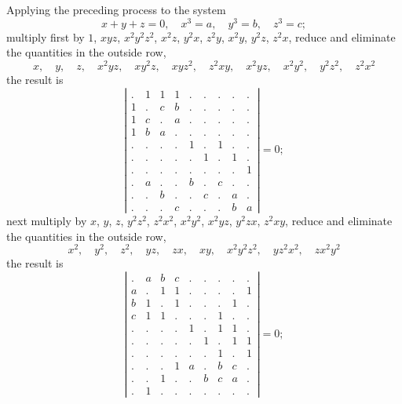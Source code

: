 \documentclass[11pt]{article}
\begin{document}
Applying the preceding process to the system
\[
x + y + z = 0, \quad x^3 = a, \quad y^3 = b, \quad z^3 = c;
\]
multiply first by $1$, $xyz$, $x^2y^2z^2$, $x^2z$, $y^2x$, $z^2y$, $x^2y$, $y^2z$, $z^2x$, reduce and eliminate the quantities in the outside row,
\[
x, \quad y, \quad z, \quad x^2yz, \quad xy^2z, \quad xyz^2, \quad z^2xy, \quad x^2yz, \quad x^2y^2, \quad y^2z^2, \quad z^2x^2
\]
the result is
\[
\left|\begin{array}{ccc|ccc|ccc}
. & 1 & 1 & 1 & . & . & . & . & . \\
1 & . & c & b & . & . & . & . & . \\
1 & c & . & a & . & . & . & . & . \\
1 & b & a & . & . & . & . & . & . \\
\hline
. & . & . & . & 1 & . & 1 & . & . \\
. & . & . & . & . & 1 & . & 1 & . \\
. & . & . & . & . & . & . & . & 1 \\
\hline
. & a & . & . & b & . & c & . & . \\
. & . & b & . & . & c & . & a & . \\
. & . & . & c & . & . & . & b & a
\end{array}\right| = 0;
\]
next multiply by $x$, $y$, $z$, $y^2z^2$, $z^2x^2$, $x^2y^2$, $x^2yz$, $y^2zx$, $z^2xy$, reduce and eliminate the quantities in the outside row,
\[
x^2, \quad y^2, \quad z^2, \quad yz, \quad zx, \quad xy, \quad x^2y^2z^2, \quad yz^2x^2, \quad zx^2y^2
\]
the result is
\[
\left|\begin{array}{ccc|ccc|ccc}
. & a & b & c & . & . & . & . & . \\
a & . & 1 & 1 & . & . & . & . & 1 \\
b & 1 & . & 1 & . & . & . & 1 & . \\
c & 1 & 1 & . & . & . & 1 & . & . \\
\hline
. & . & . & . & 1 & . & 1 & 1 & . \\
. & . & . & . & . & 1 & . & 1 & 1 \\
. & . & . & . & . & . & 1 & . & 1 \\
\hline
. & . & . & 1 & a & . & b & c & . \\
. & . & 1 & . & . & b & c & a & . \\
. & 1 & . & . & . & . & . & . & .
\end{array}\right| = 0;
\]

\newpage
\setcounter{page}{44}
\end{document}

